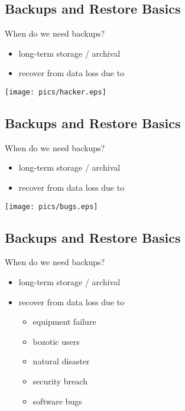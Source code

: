 \documentclass[xga]{xdvislides}
\begin{document}
\subsection{Backups and Restore Basics}
When do we need backups?
\begin{itemize}
	\item long-term storage / archival
	\item recover from data loss due to
\end{itemize}
\vspace*{\fill}
\begin{center}
	\texttt{[image: pics/hacker.eps]}
\end{center}
\vspace*{\fill}

\subsection{Backups and Restore Basics}
When do we need backups?
\begin{itemize}
	\item long-term storage / archival
	\item recover from data loss due to
\end{itemize}
\vspace*{\fill}
\begin{center}
	\texttt{[image: pics/bugs.eps]}
\end{center}
\vspace*{\fill}

\subsection{Backups and Restore Basics}
When do we need backups?
\begin{itemize}
	\item long-term storage / archival
	\item recover from data loss due to
		\begin{itemize}
			\item equipment failure
			\item bozotic users
			\item natural disaster
			\item security breach
			\item software bugs
		\end{itemize}
\end{itemize}
\end{document}
